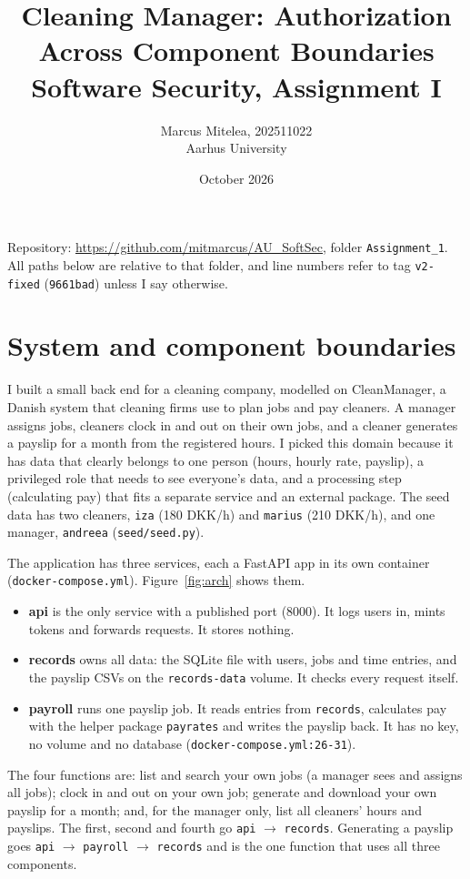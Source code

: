 \documentclass[11pt,a4paper]{article}
\title{Cleaning Manager: Authorization Across Component Boundaries\\[4pt]
\large Software Security, Assignment I}
\author{Marcus Mitelea, 202511022\\Aarhus University}
\date{October 2026}
\newcommand{\file}[1]{\nolinkurl{#1}}
\newcommand{\commit}[1]{\texttt{#1}}
\begin{document}
\maketitle

\noindent Repository: \url{https://github.com/mitmarcus/AU_SoftSec}, folder \file{Assignment_1}. All paths below are relative to that folder, and line numbers refer to tag \texttt{v2-fixed} (\commit{9661bad}) unless I say otherwise.

\section{System and component boundaries}

I built a small back end for a cleaning company, modelled on CleanManager, a Danish system that cleaning firms use to plan jobs and pay cleaners. A manager assigns jobs, cleaners clock in and out on their own jobs, and a cleaner generates a payslip for a month from the registered hours. I picked this domain because it has data that clearly belongs to one person (hours, hourly rate, payslip), a privileged role that needs to see everyone's data, and a processing step (calculating pay) that fits a separate service and an external package. The seed data has two cleaners, \texttt{iza} (180 DKK/h) and \texttt{marius} (210 DKK/h), and one manager, \texttt{andreea} (\file{seed/seed.py}).

The application has three services, each a FastAPI app in its own container (\file{docker-compose.yml}). Figure~\ref{fig:arch} shows them.

\begin{itemize}
  \item \textbf{api} is the only service with a published port (8000). It logs users in, mints tokens and forwards requests. It stores nothing.
  \item \textbf{records} owns all data: the SQLite file with users, jobs and time entries, and the payslip CSVs on the \texttt{records-data} volume. It checks every request itself.
  \item \textbf{payroll} runs one payslip job. It reads entries from \texttt{records}, calculates pay with the helper package \texttt{payrates} and writes the payslip back. It has no key, no volume and no database (\file{docker-compose.yml:26-31}).
\end{itemize}

The four functions are: list and search your own jobs (a manager sees and assigns all jobs); clock in and out on your own job; generate and download your own payslip for a month; and, for the manager only, list all cleaners' hours and payslips. The first, second and fourth go \texttt{api} $\rightarrow$ \texttt{records}. Generating a payslip goes \texttt{api} $\rightarrow$ \texttt{payroll} $\rightarrow$ \texttt{records} and is the one function that uses all three components.
\end{document}
